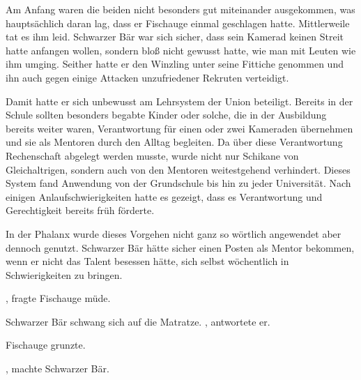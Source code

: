 \par

Am Anfang waren die beiden nicht besonders gut miteinander ausgekommen, was hauptsächlich daran lag, dass er Fischauge einmal geschlagen hatte. Mittlerweile tat es ihm leid. Schwarzer Bär war sich sicher, dass sein Kamerad keinen Streit hatte anfangen wollen, sondern bloß nicht gewusst hatte, wie man mit Leuten wie ihm umging. Seither hatte er den Winzling unter seine Fittiche genommen und ihn auch gegen einige Attacken unzufriedener Rekruten verteidigt.

\par

Damit hatte er sich unbewusst am Lehrsystem der Union beteiligt. Bereits in der Schule sollten besonders begabte Kinder oder solche, die in der Ausbildung bereits weiter waren, Verantwortung für einen oder zwei Kameraden übernehmen und sie als Mentoren durch den Alltag begleiten. Da über diese Verantwortung Rechenschaft abgelegt werden musste, wurde nicht nur Schikane von Gleichaltrigen, sondern auch von den Mentoren weitestgehend verhindert. Dieses System fand Anwendung von der Grundschule bis hin zu jeder Universität. Nach einigen Anlaufschwierigkeiten hatte es gezeigt, dass es Verantwortung und Gerechtigkeit bereits früh förderte.

\par

In der Phalanx wurde dieses Vorgehen nicht ganz so wörtlich angewendet aber dennoch genutzt. Schwarzer Bär hätte sicher einen Posten als Mentor bekommen, wenn er nicht das Talent besessen hätte, sich selbst wöchentlich in Schwierigkeiten zu bringen.

\par

, fragte Fischauge müde. 

\par

Schwarzer Bär schwang sich auf die Matratze. , antwortete er. 

\par

Fischauge grunzte. 

\par

, machte Schwarzer Bär. 

